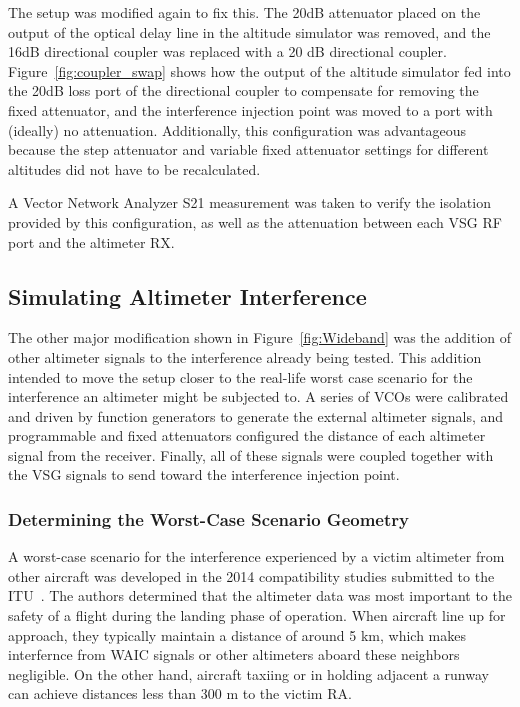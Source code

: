 The setup was modified again to fix this. The 20dB attenuator placed on the output of the optical delay line in the altitude simulator was removed, and the 16dB directional coupler was replaced with a 20 dB directional coupler. Figure~\ref{fig:coupler_swap} shows how the output of the altitude simulator fed into the 20dB loss port of the directional coupler to compensate for removing the fixed attenuator, and the interference injection point was moved to a port with (ideally) no attenuation. Additionally, this configuration was advantageous because the step attenuator and variable fixed attenuator settings for different altitudes did not have to be recalculated. 

A Vector Network Analyzer S21 measurement was taken to verify the isolation provided by this configuration, as well as the attenuation between each VSG RF port and the altimeter RX. 

\subsection{Simulating Altimeter Interference}
The other major modification shown in Figure~\ref{fig:Wideband} was the addition of other altimeter signals to the interference already being tested. This addition intended to move the setup closer to the real-life worst case scenario for the interference an altimeter might be subjected to. A series of VCOs were calibrated and driven by function generators to generate the external altimeter signals, and programmable and fixed attenuators configured the distance of each altimeter signal from the receiver. Finally, all of these signals were coupled together with the VSG signals to send toward the interference injection point. 


\subsubsection{Determining the Worst-Case Scenario Geometry}
A worst-case scenario for the interference experienced by a victim altimeter from other aircraft was developed in the 2014 compatibility studies submitted to the ITU~\cite{noauthor_compatibility_2014}. The authors determined that the altimeter data was most important to the safety of a flight during the landing phase of operation. When aircraft line up for approach, they typically maintain a distance of around 5 km, which makes interfernce from WAIC signals or other altimeters aboard these neighbors negligible. On the other hand, aircraft taxiing or in holding adjacent a runway can achieve distances less than 300 m to the victim RA. 

